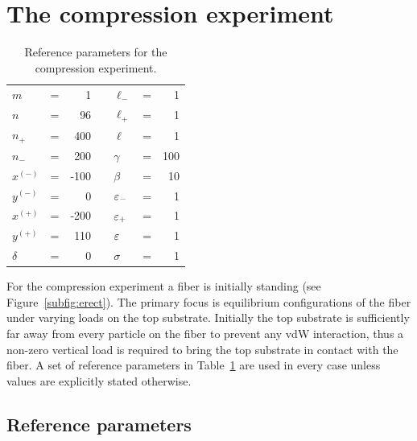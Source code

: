 \section{The compression experiment}

	\begin{table}[t]
		\centering
		\caption{Reference parameters for the compression experiment.\label{table:compression_reference}}
		\begin{tabular}{lcrclcr}
			$m$ & = & 1 & \hspace{1in} & $\ell_-$ & = & 1 \\
			$n$ & = & 96 & & $\ell_+$ & = & 1 \\
			$n_+$ & = & 400 & & $\ell$ & = & 1 \\
			$n_-$ & = & 200 & & $\gamma$ & = & 100 \\
			$x^{(-)}$ & = & -100 & & $\beta$ & = & 10 \\
			$y^{(-)}$ & = & 0 & & $\varepsilon_-$ & = & 1 \\
			$x^{(+)}$ & = & -200 & & $\varepsilon_+$ & = & 1 \\
			$y^{(+)}$ & = & 110 & & $\varepsilon$ & = & 1 \\
			$\delta$ & = & 0 & & $\sigma$ & = & 1
		\end{tabular}
	\end{table}
For the compression experiment a fiber is initially standing (see Figure~\ref{subfig:erect}). The primary focus is equilibrium configurations of the fiber under varying loads on the top substrate. Initially the top substrate is sufficiently far away from every particle on the fiber to prevent any vdW interaction, thus a non-zero vertical load is required to bring the top substrate in contact with the fiber. A set of reference parameters in Table~\ref{table:compression_reference} are used in every case unless values are explicitly stated otherwise.

\subsection{Reference parameters}

